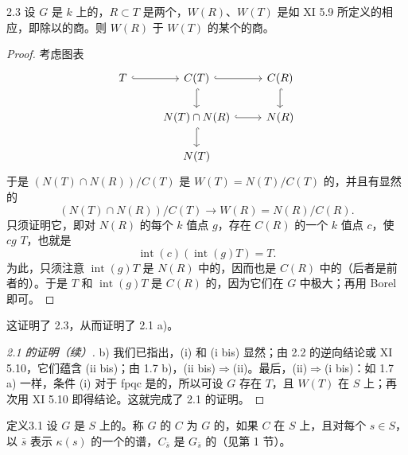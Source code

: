 \begin{SGAresult}{}{2.3}
设 $G$ 是 $k$ 上的，$R\subset T$ 是两个，$W(R)$、$W(T)$ 是如 XI 5.9 所定义的相应，即除以的商。则 $W(R)$ 于 $W(T)$ 的某个的商。
\end{SGAresult}
\begin{proof}
考虑图表
\[\begin{tikzcd}
T\arrow[r,hook]&C(T)\arrow[r,hook]\arrow[d,hook]&C(R)\arrow[d,hook]\\
&N(T)\cap N(R)\arrow[r,hook]\arrow[d,hook]&N(R)\\
&N(T)&
\end{tikzcd}\]
于是 $(N(T)\cap N(R))/C(T)$ 是 $W(T)=N(T)/C(T)$ 的，并且有显然的
\[(N(T)\cap N(R))/C(T)\longrightarrow W(R)=N(R)/C(R).\]
只须证明它，即对 $N(R)$ 的每个 $k$ 值点 $g$，存在 $C(R)$ 的一个 $k$ 值点 $c$，使 $cg$  $T$，也就是
\[\operatorname{int}(c)(\operatorname{int}(g)T)=T.\]
为此，只须注意 $\operatorname{int}(g)T$ 是 $N(R)$ 中的，因而也是 $C(R)$ 中的（后者是前者的）。于是 $T$ 和 $\operatorname{int}(g)T$ 是 $C(R)$ 的，因为它们在 $G$ 中极大；再用 Borel 即可。
\end{proof}
这证明了 2.3，从而证明了 2.1 a)。
\begin{proof}[ 2.1 的证明（续）]
b) 我们已指出，(i) 和 (i bis) 显然；由 2.2 的逆向结论或 XI 5.10，它们蕴含 (ii bis)；由 1.7 b)，(ii bis)$\Rightarrow$(ii)。最后，(ii)$\Rightarrow$(i bis)：如 1.7 a) 一样，条件 (i) 对于 fpqc 是的，所以可设 $G$ 存在 $T$，且 $W(T)$ 在 $S$ 上；再次用 XI 5.10 即得结论。这就完成了 2.1 的证明。
\end{proof}
\begin{SGAresult}{定义}{3.1}
设 $G$ 是 $S$ 上的。称 $G$ 的 $C$ 为 $G$ 的，如果 $C$ 在 $S$ 上，且对每个 $s\in S$，以 $\bar s$ 表示 $\kappa(s)$ 的一个的谱，$C_{\bar s}$ 是 $G_{\bar s}$ 的（见第 1 节）。
\end{SGAresult}
